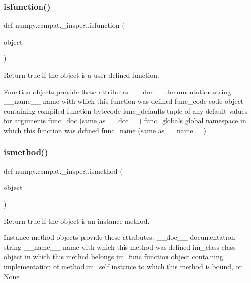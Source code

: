 \subsubsection{\texorpdfstring{isfunction()}{isfunction()}}
{\footnotesize\ttfamily def numpy.\+compat.\+\_\+inspect.\+isfunction (\begin{DoxyParamCaption}\item[{}]{object }\end{DoxyParamCaption})}

\begin{DoxyVerb}Return true if the object is a user-defined function.

Function objects provide these attributes:
    __doc__         documentation string
    __name__        name with which this function was defined
    func_code       code object containing compiled function bytecode
    func_defaults   tuple of any default values for arguments
    func_doc        (same as __doc__)
    func_globals    global namespace in which this function was defined
    func_name       (same as __name__)\end{DoxyVerb}
 \mbox{\label{namespacenumpy_1_1compat_1_1__inspect_ae59647a7593534301b0ce285e6d7eaf6}} 
\subsubsection{\texorpdfstring{ismethod()}{ismethod()}}
{\footnotesize\ttfamily def numpy.\+compat.\+\_\+inspect.\+ismethod (\begin{DoxyParamCaption}\item[{}]{object }\end{DoxyParamCaption})}

\begin{DoxyVerb}Return true if the object is an instance method.

Instance method objects provide these attributes:
    __doc__         documentation string
    __name__        name with which this method was defined
    im_class        class object in which this method belongs
    im_func         function object containing implementation of method
    im_self         instance to which this method is bound, or None\end{DoxyVerb}
 \mbox{\label{namespacenumpy_1_1compat_1_1__inspect_ab1438af7fbbffb0fd2b5a564cdd7eef8}} 
